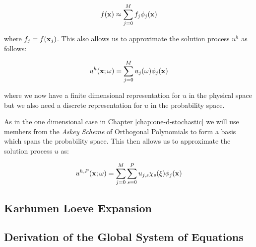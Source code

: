 \begin{equation}
    f(\mathbf{x}) \approx \sum_{j=0}^Mf_j\phi_j(\mathbf{x})
\end{equation}

where $f_j = f(\mathbf{x}_j)$. This also allows us to approximate the solution
process $u^h$ as follows:

\begin{equation}
    u^h(\mathbf{x};\omega) = \sum_{j=0}^Mu_j(\omega)\phi_j(\mathbf{x})
\end{equation}

where we now have a finite dimensional representation for $u$ in the physical
space but we also need a discrete representation for $u$ in the probability
space.

As in the one dimensional case in Chapter \ref{chap:one-d-stochastic} we will
use members from the \textit{Askey Scheme} of Orthogonal Polynomials to form a
basis which spans the probability space. This then allows us to approximate the
solution process $u$ as:

\begin{equation}
    u^{h,P}(\mathbf{x};\omega) = \sum_{j=0}^M\sum_{s=0}^Pu_{j,s}
        \chi_s(\xi)\phi_j(\mathbf{x})
\end{equation}

\subsection{Karhumen Loeve Expansion}

\subsection{Derivation of the Global System of Equations}
